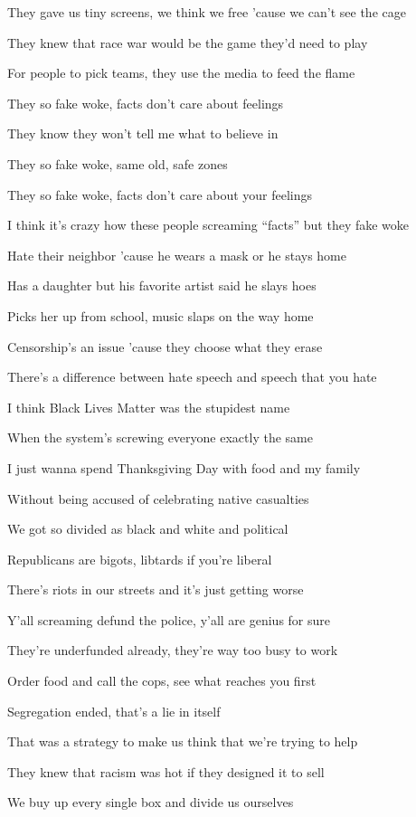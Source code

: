 \begin{refsection}
\begin{tcolorbox}[quote]
They gave us tiny screens, we think we free 'cause we can't see the cage

They knew that race war would be the game they'd need to play

For people to pick teams, they use the media to feed the flame

They so fake woke, facts don't care about feelings

They know they won't tell me what to believe in

They so fake woke, same old, safe zones

They so fake woke, facts don't care about your feelings

I think it's crazy how these people screaming \enquote{facts} but they fake woke

Hate their neighbor 'cause he wears a mask or he stays home

Has a daughter but his favorite artist said he slays hoes

Picks her up from school, music slaps on the way home

Censorship's an issue 'cause they choose what they erase

There's a difference between hate speech and speech that you hate

I think Black Lives Matter was the stupidest name

When the system's screwing everyone exactly the same

I just wanna spend Thanksgiving Day with food and my family

Without being accused of celebrating native casualties

We got so divided as black and white and political

Republicans are bigots, libtards if you're liberal

There's riots in our streets and it's just getting worse

Y'all screaming defund the police, y'all are genius for sure

They're underfunded already, they're way too busy to work

Order food and call the cops, see what reaches you first

Segregation ended, that's a lie in itself

That was a strategy to make us think that we're trying to help

They knew that racism was hot if they designed it to sell

We buy up every single box and divide us ourselves


\end{tcolorbox}
\end{refsection}
